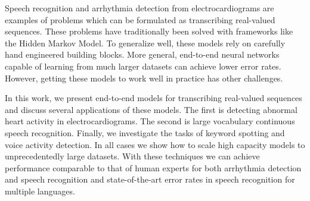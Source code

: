 
\beforepreface
{}

Speech recognition and arrhythmia detection from electrocardiograms are
examples of problems which can be formulated as transcribing real-valued
sequences. These problems have traditionally been solved with frameworks like
the Hidden Markov Model. To generalize well, these models rely on carefully
hand engineered building blocks. More general, end-to-end neural networks
capable of learning from much larger datasets can achieve lower error rates.
However, getting these models to work well in practice has other challenges.

In this work, we present end-to-end models for transcribing real-valued
sequences and discuss several applications of these models. The first is
detecting abnormal heart activity in electrocardiograms. The second is large
vocabulary continuous speech recognition. Finally, we investigate the tasks of
keyword spotting and voice activity detection. In all cases we show how to
scale high capacity models to unprecedentedly large datasets. With these
techniques we can achieve performance comparable to that of human experts for
both arrhythmia detection and speech recognition and state-of-the-art error
rates in speech recognition for multiple languages.
